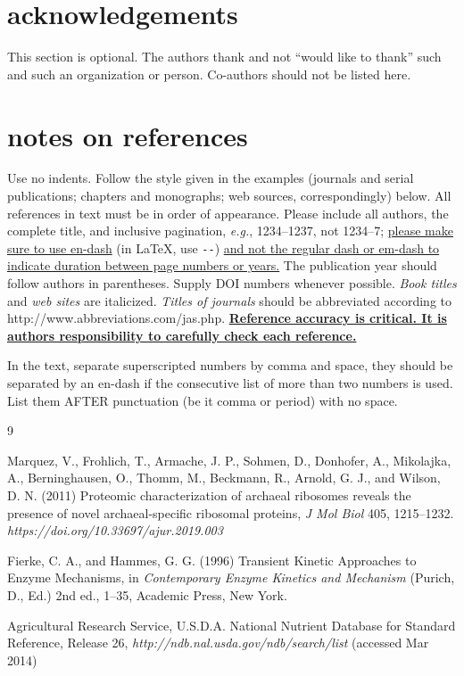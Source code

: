 \documentclass[10pt]{article}
\begin{document}
\section*{acknowledgements}
This section is optional. The authors thank and not ``would like to thank'' such and such an organization or person. Co-authors should not be listed here.

\section*{notes on references}

Use no indents. Follow the style given in the examples (journals and serial publications;\cite{journal} chapters and monographs;\cite{chapters} web sources,\cite{web} correspondingly) below. All references in text must be in order of appearance. Please include all authors, the complete title, and inclusive pagination, \textit{e.g.}, 1234--1237, not 1234--7; \ul{please make sure to use en-dash} (in \LaTeX, use \verb+--+) \ul{and not the regular dash or em-dash to indicate duration between page numbers or years.} The publication year should follow authors in parentheses. Supply DOI numbers whenever possible. \textit{Book titles} and \textit{web sites} are italicized. \textit{Titles of journals} should be abbreviated according to http://www.abbreviations.com/jas.php. \textbf{\ul{Reference accuracy is critical. It is authors responsibility to carefully check each reference.}} 

In the text, separate superscripted numbers by comma and space,\cite{journal,chapters} they should be separated by an en-dash if the consecutive list of more than two numbers is used.\cite{journal,chapters,web} List them AFTER punctuation (be it comma or period) with no space.

\begin{thebibliography}{9} %

 Marquez, V., Frohlich, T., Armache, J. P., Sohmen, D., Donhofer, A., Mikolajka, A., Berninghausen, O., Thomm, M., Beckmann, R., Arnold, G. J., and Wilson, D. N. (2011) Proteomic characterization of archaeal ribosomes reveals the presence of novel archaeal-specific ribosomal proteins, \textit{J Mol Biol} 405, 1215--1232. \textit {https://doi.org/10.33697/ajur.2019.003}


 Fierke, C. A., and Hammes, G. G. (1996) Transient Kinetic Approaches to Enzyme Mechanisms, in \textit{Contemporary Enzyme Kinetics and Mechanism} (Purich, D., Ed.) 2nd ed., 1--35, Academic Press, New York.

 Agricultural Research Service, U.S.D.A. National Nutrient Database for Standard Reference, Release 26, \textit{http://ndb.nal.usda.gov/ndb/search/list} (accessed Mar 2014)
\end{thebibliography}
\end{document}
